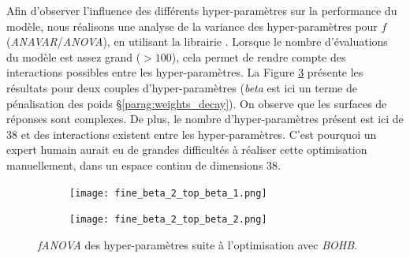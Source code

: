 % 
% 
% 

Afin d'observer l'influence des différents hyper-paramètres sur la performance du modèle, nous réalisons une analyse de la variance des hyper-paramètres pour $f$ (\textit{ANAVAR}/\textit{ANOVA}), en utilisant la librairie \citeauthor{hutter_efficient_2014} \cite{hutter_efficient_2014}.
Lorsque le nombre d'évaluations du modèle est assez grand ($> 100$), cela permet de rendre compte des interactions possibles entre les hyper-paramètres.
La Figure \ref{fig:fanova} présente les résultats pour deux couples d'hyper-paramètres (\textit{beta} est ici un terme de pénalisation des poids §\ref{parag:weights_decay}).
On observe que les surfaces de réponses sont complexes.
De plus, le nombre d'hyper-paramètres présent est ici de 38 et des interactions existent entre les hyper-paramètres.
C'est pourquoi un expert humain aurait eu de grandes difficultés à réaliser cette optimisation manuellement, dans un espace continu de dimensions 38.

\begin{figure}[tbp]
    \centering
    \begin{subfigure}{.49\textwidth}
        \centering
        \texttt{[image: fine\_beta\_2\_top\_beta\_1.png]}
        \label{fig:fanova_a}
    \end{subfigure}\hfill%
    \begin{subfigure}{.49\textwidth}
        \centering
        \texttt{[image: fine\_beta\_2\_top\_beta\_2.png]}
        \label{fig:fanova_b}
    \end{subfigure}
    \caption{\textit{fANOVA} des hyper-paramètres suite à l'optimisation avec \textit{BOHB}.}
    \label{fig:fanova}
\end{figure}

